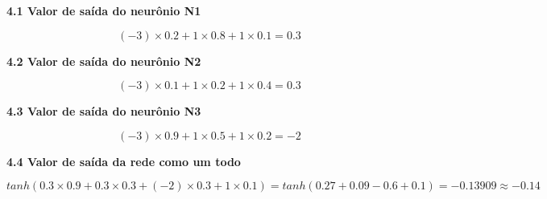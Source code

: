 
\begin{adjustwidth}{1em}{}
\textbf{4.1 Valor de saída do neurônio N1}
\end{adjustwidth}
\begin{equation*}
    (-3)\times0.2 + 1\times0.8 + 1\times0.1 = 0.3
\end{equation*}

\begin{adjustwidth}{1em}{}
\textbf{4.2 Valor de saída do neurônio N2}
\end{adjustwidth}
\begin{equation*}
    (-3)\times0.1 + 1\times0.2 + 1\times0.4 = 0.3
\end{equation*}

\begin{adjustwidth}{1em}{}
\textbf{4.3 Valor de saída do neurônio N3}
\end{adjustwidth}
\begin{equation*}
    (-3)\times0.9 + 1\times0.5 + 1\times0.2 = -2
\end{equation*}

\begin{adjustwidth}{1em}{}
\textbf{4.4 Valor de saída da rede como um todo}
\end{adjustwidth}
\begin{equation*}
    tanh(0.3\times0.9 + 0.3\times0.3 + (-2)\times0.3 + 1\times0.1) = tanh(0.27 + 0.09 - 0.6 + 0.1) = -0.13909 \approx -0.14
\end{equation*}